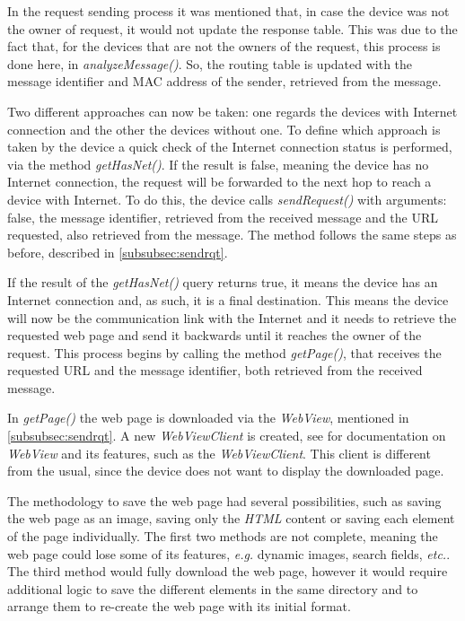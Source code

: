 In the request sending process it was mentioned that, in case the device was not the owner of request, it would not update the response table. This was due to the fact that, for the devices that are not the owners of the request, this process is done here, in \textit{analyzeMessage()}. So, the routing table is updated with the message identifier and \gls{MAC} address of the sender, retrieved from the message.

Two different approaches can now be taken: one regards the devices with Internet connection and the other the devices without one. To define which approach is taken by the device a quick check of the Internet connection status is performed, via the method \textit{getHasNet()}. If the result is false, meaning the device has no Internet connection, the request will be forwarded to the next hop to reach a device with Internet. To do this, the device calls \textit{sendRequest()} with arguments: false, the message identifier, retrieved from the received message and the \gls{URL} requested, also retrieved from the message. The method follows the same steps as before, described in \ref{subsubsec:sendrqt}.

If the result of the \textit{getHasNet()} query returns true, it means the device has an Internet connection and, as such, it is a final destination. This means the device will now be the communication link with the Internet and it needs to retrieve the requested web page and send it backwards until it reaches the owner of the request. This process begins by calling the method \textit{getPage()}, that receives the requested \gls{URL} and the message identifier, both retrieved from the received message.

In \textit{getPage()} the web page is downloaded via the \textit{WebView}, mentioned in \ref{subsubsec:sendrqt}. A new \textit{WebViewClient} is created, see \cite{webview} for documentation on \textit{WebView} and its features, such as the \textit{WebViewClient}. This client is different from the usual, since the device does not want to display the downloaded page.

The methodology to save the web page had several possibilities, such as saving the web page as an image, saving only the \textit{HTML} content or saving each element of the page individually. The first two methods are not complete, meaning the web page could lose some of its features, \textit{e.g.} dynamic images, search fields, \textit{etc.}. The third method would fully download the web page, however it would require additional logic to save the different elements in the same directory and to arrange them to re-create the web page with its initial format.

